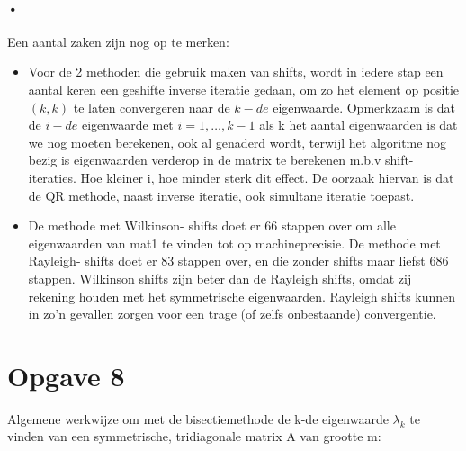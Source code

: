 \documentclass[]{article}
\newcommand{\opgave}[1]{\pagebreak\section*{Opgave #1}}
\begin{document}
\begin{table}
\noindent{}
\caption{convergentie QR methodes voor eigenwaardenberekening}
\label{tabelOpgave4}
\end{table}

\paragraph{•}
Een aantal zaken zijn nog op te merken:
\begin{itemize}
	\item Voor de 2 methoden die gebruik maken van shifts, wordt in iedere stap een aantal keren een geshifte inverse iteratie gedaan, om zo het element op positie $(k,k)$ te laten convergeren naar de $k-de$ eigenwaarde. Opmerkzaam is dat de $i-de$ eigenwaarde met $i = 1,\dots,k-1$ als k het aantal eigenwaarden is dat we nog moeten berekenen, ook al genaderd wordt, terwijl het algoritme nog bezig is eigenwaarden verderop in de matrix te berekenen m.b.v shift- iteraties. Hoe kleiner i, hoe minder sterk dit effect. De oorzaak hiervan is dat de QR methode, naast inverse iteratie, ook simultane iteratie toepast.
	\item De methode met Wilkinson- shifts doet er 66 stappen over om alle eigenwaarden van mat1 te vinden tot op machineprecisie. De methode met Rayleigh- shifts doet er 83 stappen over, en die zonder shifts maar liefst 686 stappen. Wilkinson shifts zijn beter dan de Rayleigh shifts, omdat zij rekening houden met het symmetrische eigenwaarden. Rayleigh shifts kunnen in zo'n gevallen zorgen voor een trage (of zelfs onbestaande) convergentie.
\end{itemize}


\opgave{8}

Algemene werkwijze om met de bisectiemethode de k-de eigenwaarde $\lambda_k$ te vinden van een symmetrische, tridiagonale matrix A van grootte m:
\end{document}
